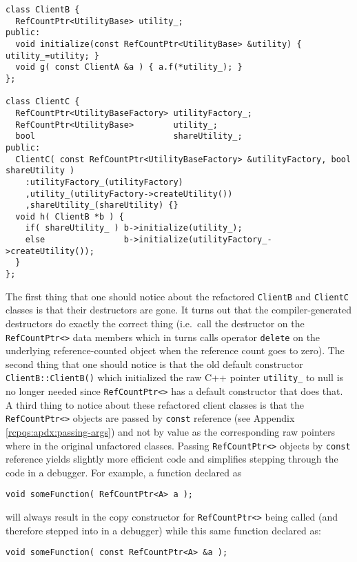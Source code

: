 \documentclass[pdf,ps2pdf,11pt]{SANDreport}
\begin{document}
{\small\begin{verbatim}
class ClientB {
  RefCountPtr<UtilityBase> utility_;
public:
  void initialize(const RefCountPtr<UtilityBase> &utility) { utility_=utility; }
  void g( const ClientA &a ) { a.f(*utility_); }
};

class ClientC {
  RefCountPtr<UtilityBaseFactory> utilityFactory_;
  RefCountPtr<UtilityBase>        utility_;
  bool                            shareUtility_;
public:
  ClientC( const RefCountPtr<UtilityBaseFactory> &utilityFactory, bool shareUtility )
    :utilityFactory_(utilityFactory)
    ,utility_(utilityFactory->createUtility())
    ,shareUtility_(shareUtility) {}
  void h( ClientB *b ) {
    if( shareUtility_ ) b->initialize(utility_);
    else                b->initialize(utilityFactory_->createUtility());
  }
};
\end{verbatim}}

The first thing that one should notice about the refactored
{}\texttt{ClientB} and {}\texttt{ClientC} classes is that their
destructors are gone.  It turns out that the compiler-generated
destructors do exactly the correct thing (i.e.~call the destructor on
the {}\texttt{Ref\-Count\-Ptr<>} data members which in turns calls
operator {}\texttt{delete} on the underlying reference-counted object
when the reference count goes to zero).  The second thing that one
should notice is that the old default constructor
{}\texttt{ClientB::ClientB()} which initialized the raw C++ pointer
{}\texttt{utility\_} to null is no longer needed since
{}\texttt{Ref\-Count\-Ptr<>} has a default constructor that does that.
A third thing to notice about these refactored client classes is that
the {}\texttt{Ref\-Count\-Ptr<>} objects are passed by
{}\texttt{const} reference (see Appendix
{}\ref{rcpqs:apdx:passing-args}) and not by value as the corresponding
raw pointers where in the original unfactored classes.  Passing
{}\texttt{Ref\-Count\-Ptr<>} objects by {}\texttt{const} reference
yields slightly more efficient code and simplifies stepping through
the code in a debugger.  For example, a function declared as

{\small\begin{verbatim}
void someFunction( RefCountPtr<A> a );
\end{verbatim}}

{}\noindent{}will always result in the copy constructor for
{}\texttt{Ref\-Count\-Ptr<>} being called (and therefore stepped into
in a debugger) while this same function declared as:

{\small\begin{verbatim}
void someFunction( const RefCountPtr<A> &a );
\end{verbatim}}
\end{document}
